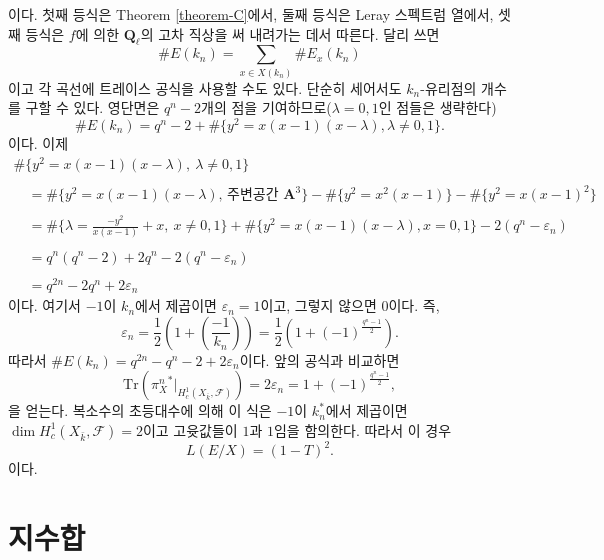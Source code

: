 이다. 첫째 등식은 Theorem \ref{theorem-C}에서, 둘째 등식은
Leray 스펙트럼 열에서, 셋째 등식은 $f$에 의한
$\mathbf{Q}_\ell$의 고차 직상을 써 내려가는 데서 따른다. 달리 쓰면
$$
\# E(k_n) = \sum_{x \in X(k_n)} \# E_x(k_n)
$$
이고 각 곡선에 트레이스 공식을 사용할 수도 있다. 단순히 세어서도
$k_n$-유리점의 개수를 구할 수 있다. 영단면은 $q^n -2$개의 점을
기여하므로($\lambda = 0, 1$인 점들은 생략한다)
$$
\# E(k_n) =
q^n - 2 + \# \{y^2 = x(x - 1)(x - \lambda), \lambda\neq 0, 1\}.
$$
이다. 이제
$$
\begin{matrix}
\# \{y^2 = x(x - 1)(x - \lambda),\ \lambda\neq 0, 1\} \\
\\
\quad =
\# \{y^2 = x(x - 1)(x - \lambda)\text{, 주변공간 }\mathbf{A}^3\}
- \# \{y^2 = x^2(x - 1)\} - \# \{y^2 = x(x - 1)^2\}\\
\\
\quad = \# \{\lambda = \frac{-y^2}{x(x - 1)} + x,\ x\neq 0, 1\} +
\# \{y^2 = x(x - 1)(x - \lambda), x = 0, 1\} - 2(q^n - \varepsilon_n) \\
\\
\quad = q^n(q^n - 2)+2q^n - 2(q^n - \varepsilon_n)\\
\\
\quad = q^{2n}-2q^n+2\varepsilon_n
\end{matrix}
$$
이다. 여기서 $-1$이 $k_n$에서 제곱이면 $\varepsilon_n = 1$이고,
그렇지 않으면 0이다. 즉,
$$
\varepsilon_n = \frac{1}{2}\left(1+\left(\frac{-1}{k_n}\right)\right) =
\frac{1}{2}\left(1+(-1)^{\frac{q^n - 1}{2}}\right).
$$
따라서 $ \# E(k_n) = q^{2n} - q^n - 2+ 2\varepsilon_n$이다.
앞의 공식과 비교하면
$$
\text{Tr}({\pi_X^n}^* |_{H_c^1(X_{\bar k}, \mathcal{F})}) =
2 \varepsilon_n = 1 + (-1)^{\frac{q^n - 1}{2}},
$$
을 얻는다. 복소수의 초등대수에 의해 이 식은 $-1$이 $k_n^*$에서
제곱이면 $\dim H_c^1(X_{\bar k}, \mathcal{F}) = 2$이고 고윳값들이
$1$과 $1$임을 함의한다. 따라서 이 경우
$$
L(E/X) = (1 - T)^2.
$$
이다.


\section{지수합}
\label{section-exponential-sums}

